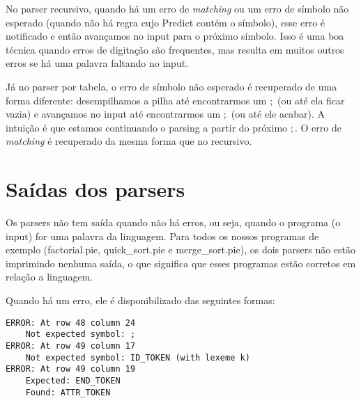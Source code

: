 No parser recursivo, quando há um erro de \textit{matching} ou um erro de símbolo não esperado (quando não há regra cujo Predict contém o símbolo), esse erro é notificado e então avançamos no input para o próximo símbolo. Isso é uma boa técnica quando erros de digitação são frequentes, mas resulta em muitos outros erros se há uma palavra faltando no input. 

Já no parser por tabela, o erro de símbolo não esperado é recuperado de uma forma diferente: desempilhamos a pilha até encontrarmos um $;$ (ou até ela ficar vazia) e avançamos no input até encontrarmos um $;$ (ou até ele acabar). A intuição é que estamos continuando o parsing a partir do próximo $;$. O erro de \textit{matching} é recuperado da mesma forma que no recursivo.

\section{Saídas dos parsers}
Os parsers não tem saída quando não há erros, ou seja, quando o programa (o input) for uma palavra da linguagem. Para todos os nossos programas de exemplo (factorial.pie, quick_sort.pie e merge_sort.pie), os dois parsers não estão imprimindo nenhuma saída, o que significa que esses programas estão corretos em relação a linguagem.

Quando há um erro, ele é disponibilizado das seguintes formas:
\vspace{0.5cm}

\begin{verbatim}
ERROR: At row 48 column 24 
    Not expected symbol: ;
ERROR: At row 49 column 17 
    Not expected symbol: ID_TOKEN (with lexeme k)
ERROR: At row 49 column 19
    Expected: END_TOKEN
    Found: ATTR_TOKEN
\end{verbatim} 


